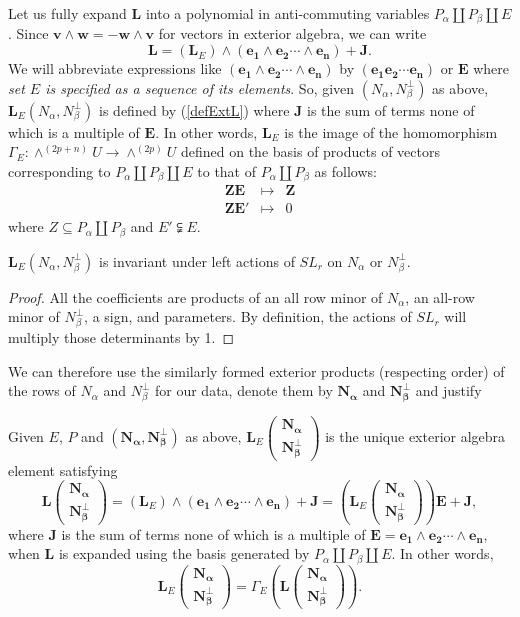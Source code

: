 \documentclass[Unicode]{cedram-alco}
\newcommand{\ext}[1]{\ensuremath{\mathbf{#1}}}
\newcommand{\dunion}{\coprod}
\newcommand{\extLVert}[2]{\ext{L}\left( \begin{array}{c} {#1}\\ {#2} \end{array} \right)}
\newcommand{\extLVertSub}[3]{\ext{L}_{#1}\left( \begin{array}{c} {#2}\\ {#3} \end{array} \right)}
\begin{document}
Let us fully expand $\ext{L}$ into a polynomial in anti-commuting variables
$P_\alpha \dunion P_\beta \dunion E$.  Since $\ext{v}\wedge\ext{w}=-\ext{w}\wedge\ext{v}$ for vectors in
exterior algebra, we can write
\[
\ext{L} = (\ext{L}_E)\wedge (\ext{e_1}\wedge\ext{e_2}\cdots\wedge\ext{e_n}) + \ext{J}.
\]
We will abbreviate expressions like $(\ext{e_1}\wedge\ext{e_2}\cdots\wedge\ext{e_n})$ by
$(\ext{e_1}\ext{e_2}\cdots\ext{e_n})$ or $\ext{E}$ where \emph{set $E$ is specified as a sequence of its elements}.
So, given $(N_\alpha,N_\beta^\perp)$ as above, $\ext{L}_E(N_\alpha,N_\beta^\perp)$ is defined by (\ref{defExtL}) where
$\ext{J}$ is the sum of terms none of which is a multiple of $\ext{E}$.
In other words, $\ext{L}_E$ is the image of the homomorphism
$\Gamma_E:\wedge^{(2p+n)}U\rightarrow\wedge^{(2p)}U$ defined on the basis of
products of vectors corresponding to $P_\alpha \dunion P_\beta \dunion E$ to that
of $P_\alpha \dunion P_\beta$ as follows:
\[
   \begin{array}{ccc}
     \ext{Z}\ext{E} & \longmapsto & \ext{Z} \\
     \ext{Z}\ext{E'} & \longmapsto & 0
   \end{array}
\]
where $Z\subseteq P_\alpha \dunion P_\beta$ and $E'\subsetneqq E$.

\begin{prop}
  $\ext{L}_E(N_\alpha,N_\beta^\perp)$ is invariant under left actions of $SL_r$ on $N_\alpha$ or $N_\beta^\perp$.
\end{prop}
\begin{proof}
  All the coefficients are products of an all row minor of $N_\alpha$, an all-row minor of $N_\beta^\perp$, a sign, and
  parameters.
  By definition, the actions of $SL_r$ will multiply those determinants by 1. 
\end{proof}

We can therefore use the similarly formed exterior products
(respecting order) of the rows of $N_\alpha$ and $N_\beta^\perp$
for our data, denote them by 
$\ext{N_\alpha}$ and $\ext{N_\beta^\perp}$
and justify

\begin{defi}
  Given $E$, $P$ and $(\ext{N_\alpha},\ext{N_\beta^\perp})$ as above,
  $\extLVertSub{E}{\ext{N_\alpha}}{\ext{N_\beta^\perp}}$ is the
  unique exterior algebra element satisfying
  \[
  \extLVert{\ext{N_\alpha}}{\ext{N_\beta^\perp}}=
  (\ext{L}_E)\wedge (\ext{e_1}\wedge\ext{e_2}\cdots\wedge\ext{e_n}) + \ext{J} =
  (\extLVertSub{E}{\ext{N_\alpha}}{\ext{N_\beta^\perp}})\ext{E}+\ext{J},
  \]
where $\ext{J}$ is the sum of terms none of which is a multiple of
$\ext{E}=\ext{e_1}\wedge\ext{e_2}\cdots\wedge\ext{e_n}$, when
$\ext{L}$ is expanded using the basis generated by $P_\alpha \dunion
P_\beta \dunion E$.  In other words,
  \[ 
  \extLVertSub{E}
              {\ext{N_\alpha}}
              {\ext{N_\beta^\perp}}
              =
              \Gamma_E(
              \extLVert{\ext{N_\alpha}}{\ext{N_\beta^\perp}}).
  \]
\end{defi}
\end{document}
